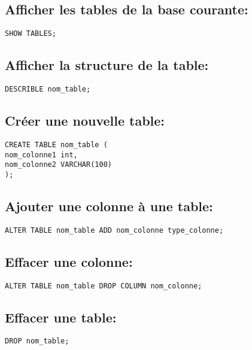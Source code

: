 \documentclass[11pt]{article}
\begin{document}
\subsection{Afficher les tables de la base courante:}
\label{sec:org388e285}

\begin{verbatim}
SHOW TABLES;
\end{verbatim}

\subsection{Afficher la structure de la table:}
\label{sec:org4d98a60}

\begin{verbatim}
DESCRIBLE nom_table;
\end{verbatim}

\subsection{Créer une nouvelle table:}
\label{sec:orgf75a940}

\begin{verbatim}
CREATE TABLE nom_table (
nom_colonne1 int,
nom_colonne2 VARCHAR(100)
);
\end{verbatim}

\subsection{Ajouter une colonne à une table:}
\label{sec:orgdcd58c5}
\begin{verbatim}
ALTER TABLE nom_table ADD nom_colonne type_colonne;
\end{verbatim}

\subsection{Effacer une colonne:}
\label{sec:org5a24125}
\begin{verbatim}
ALTER TABLE nom_table DROP COLUMN nom_colonne;
\end{verbatim}

\subsection{Effacer une table:}
\label{sec:org15125f3}
\begin{verbatim}
DROP nom_table;
\end{verbatim}
\end{document}

